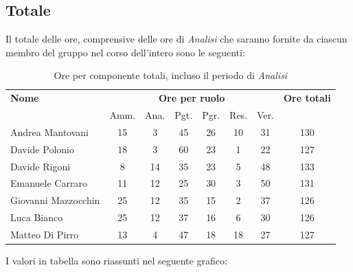     
    
\pagebreak
\subsection{Totale}
Il totale delle ore, comprensive delle ore di \textit{Analisi} che saranno fornite da ciascun membro
del gruppo nel corso dell’intero  sono le seguenti:

\begin{table}[H]
\begin{tabular}{lccccccc}
\toprule
    \textbf{Nome}  & \multicolumn{6}{c}{\textbf{Ore per ruolo}} & \textbf{Ore totali} \\
     & Amm. & Ana. & Pgt. & Pgr. & Res. & Ver. & \\
    \midrule
   
	   Andrea Mantovani & 15 & 3 & 45 & 26 & 10 & 31 & 130 \\
	     Davide Polonio & 18 & 3 & 60 & 23 & 1 & 22 & 127 \\
	      Davide Rigoni & 8 & 14 & 35 & 23 & 5 & 48 & 133 \\
	   Emanuele Carraro & 11 & 12 & 25 & 30 & 3 & 50 & 131 \\
	Giovanni Mazzocchin & 25 & 12 & 35 & 15 & 2 & 37 & 126 \\ 
	        Luca Bianco & 25 & 12 & 37 & 16 & 6 & 30 & 126 \\ 
	    Matteo Di Pirro & 13 & 4 & 47 & 18 & 18 & 27 & 127 \\ 
   
    \bottomrule
\end{tabular}
\caption{Ore per componente totali, incluso il periodo di \textit{Analisi}}
\end{table}

I valori in tabella sono riassunti nel seguente grafico: \\ 


